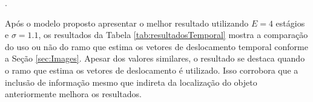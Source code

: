 \begin{table}[h]
\small
\centering	
	\caption{\label{tab:resultadosEstagios} Resultados experimentais para a detecção dos alevinos com o método proposto. Comparação entre a variação na quantidade de estágios E usando $\sigma = 1.1$}.
\end{table}

Após o modelo proposto apresentar o melhor resultado utilizando $E = 4$ estágios e $\sigma = 1.1$, os resultados da Tabela \ref{tab:resultadosTemporal} mostra a comparação do uso ou não do ramo que estima os vetores de deslocamento temporal conforme a Seção \ref{sec:Images}.
Apesar dos valores similares, o resultado se destaca quando o ramo que estima os vetores de deslocamento é utilizado.
Isso corrobora que a inclusão de informação mesmo que indireta da localização do objeto anteriormente melhora os resultados.

